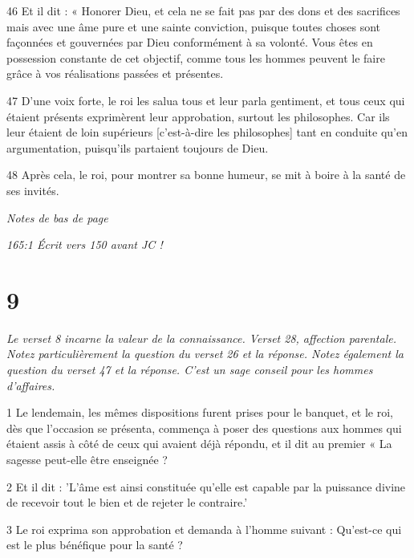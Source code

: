 \par 46 Et il dit : « Honorer Dieu, et cela ne se fait pas par des dons et des sacrifices mais avec une âme pure et une sainte conviction, puisque toutes choses sont façonnées et gouvernées par Dieu conformément à sa volonté. Vous êtes en possession constante de cet objectif, comme tous les hommes peuvent le faire grâce à vos réalisations passées et présentes.

\par 47 D'une voix forte, le roi les salua tous et leur parla gentiment, et tous ceux qui étaient présents exprimèrent leur approbation, surtout les philosophes. Car ils leur étaient de loin supérieurs [c'est-à-dire les philosophes] tant en conduite qu'en argumentation, puisqu'ils partaient toujours de Dieu.

\par 48 Après cela, le roi, pour montrer sa bonne humeur, se mit à boire à la santé de ses invités.

\par \textit{Notes de bas de page}

\par \textit{165:1 Écrit vers 150 avant JC !}

\chapter{9}

\par \textit{Le verset 8 incarne la valeur de la connaissance. Verset 28, affection parentale. Notez particulièrement la question du verset 26 et la réponse. Notez également la question du verset 47 et la réponse. C'est un sage conseil pour les hommes d'affaires.}

\par 1 Le lendemain, les mêmes dispositions furent prises pour le banquet, et le roi, dès que l'occasion se présenta, commença à poser des questions aux hommes qui étaient assis à côté de ceux qui avaient déjà répondu, et il dit au premier « La sagesse peut-elle être enseignée ?

\par 2 Et il dit : 'L'âme est ainsi constituée qu'elle est capable par la puissance divine de recevoir tout le bien et de rejeter le contraire.'

\par 3 Le roi exprima son approbation et demanda à l'homme suivant : Qu'est-ce qui est le plus bénéfique pour la santé ?

